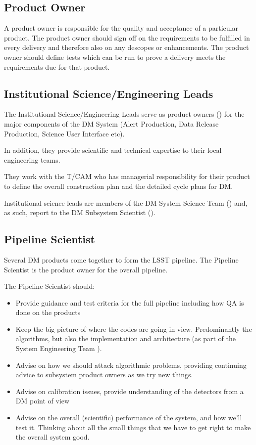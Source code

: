 \subsection{Product Owner \label{role:prodo}}

A product owner is responsible for the quality and acceptance of a particular product.
The product owner should sign off on the requirements to be fulfilled in every delivery and therefore also on any descopes or enhancements.
The product owner should define tests which can be run to prove a delivery meets the requirements due for that product.

\subsection{Institutional Science/Engineering Leads \label{role:scilead}}

The Institutional Science/Engineering Leads serve as product owners () for the major components of the DM System (Alert Production, Data Release Production, Science User Interface etc).

In addition, they provide scientific and technical expertise to their local engineering teams.

They work with the T/CAM who has managerial responsibility for their product to define the overall construction plan and the detailed cycle plans for DM.

Institutional science leads are members of the DM System Science Team () and, as such, report to the DM Subsystem Scientist ().

\subsection{Pipeline Scientist \label{role:pipe}}

Several DM products come together to form the LSST pipeline. The Pipeline Scientist is the product owner for the overall pipeline.

The Pipeline Scientist should:

\begin{itemize}

\item Provide guidance and test criteria for the full pipeline including how QA is done on the products
\item Keep the big picture of where the codes are going in view. Predominantly the algorithms, but also the implementation and architecture (as part of the System Engineering Team ).
\item Advise on how we should attack algorithmic problems, providing continuing advice to subsystem product owners as we try new things.
\item Advise on calibration issues, provide understanding of the detectors from a DM point of view
\item Advise on the overall (scientific) performance of the system, and how we'll test it.  Thinking about all the small things that we have to get right to make the overall system good.

\end{itemize}

